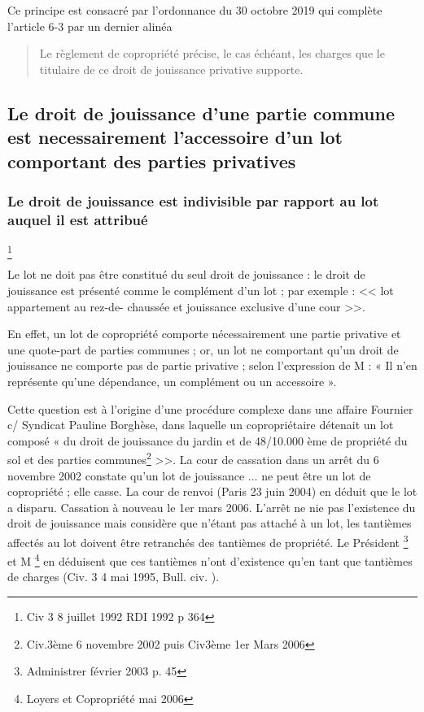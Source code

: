 			Ce principe est consacré par l’ordonnance du 30 octobre 2019 qui complète l’article 6-3 par un dernier
			alinéa
			\begin{quote}
				Le règlement de copropriété précise, le cas échéant, les charges que le titulaire de ce droit de
				jouissance privative supporte.
			\end{quote}
	
	\subsection{Le droit de jouissance d’une partie commune est necessairement l’accessoire d’un lot comportant des parties privatives}
	
		\subsubsection{Le droit de jouissance est indivisible par rapport au lot auquel il est attribué}\footnote{Civ 3\degre{} 8 juillet 1992 RDI 1992 p 364}
		
			Le lot ne doit pas être constitué du seul droit de jouissance : le droit de jouissance est présenté
			comme le complément d’un lot ; par exemple : << lot  appartement au rez-de- chaussée et
			jouissance exclusive d’une cour >>.
			
			En effet, un lot de copropriété comporte nécessairement une partie privative et une quote-part de parties
			communes ; or, un lot ne comportant qu’un droit de jouissance ne comporte pas de partie privative ; selon
			l’expression de M  : « Il n’en représente qu’une dépendance, un complément ou un
			accessoire ».
			
			Cette question est à l’origine d’une procédure complexe dans une affaire Fournier c/ Syndicat Pauline
			Borghèse, dans laquelle un copropriétaire détenait un lot composé « du droit de jouissance du jardin et
			de 48/10.000 ème de propriété du sol et des parties communes\footnote{Civ.3ème 6 novembre 2002 puis Civ3ème 1er Mars 2006} >>.
			La cour de cassation dans un arrêt du 6 novembre 2002 constate qu’un lot de jouissance $\dots$ ne peut être
			un lot de copropriété ; elle casse. La cour de renvoi (Paris 23 juin 2004) en déduit que le lot a
			disparu. Cassation à nouveau le 1er mars 2006. L’arrêt ne nie pas l’existence du droit de jouissance
			mais considère que n’étant pas attaché à un lot, les tantièmes affectés au lot doivent être retranchés
			des tantièmes de propriété. Le Président \footnote{Administrer février 2003 p. 45} et M \footnote{Loyers et Copropriété mai 2006 } en déduisent que ces
			tantièmes n’ont d’existence qu’en tant que tantièmes de charges (Civ. 3\degre{} 4 mai 1995, Bull. civ. ).
			
